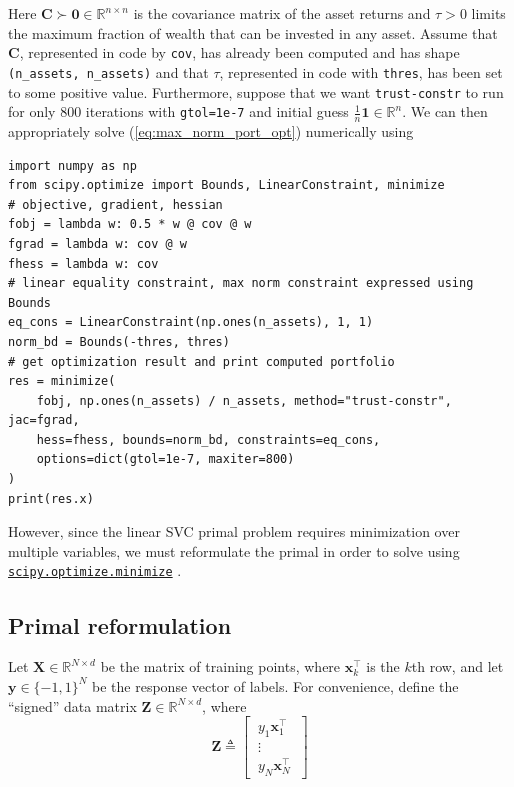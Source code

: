 \documentclass{article}
\numberwithin{equation}{section}
\newcommand{\minimize}{%
    \href{%
        https://docs.scipy.org/doc/scipy/reference/generated/%
        scipy.optimize.minimize.html%
    }{\texttt{scipy.optimize.minimize}}%
}
\begin{document}
Here $ \mathbf{C} \succ \mathbf{0} \in \mathbb{R}^{n \times n} $ is the
covariance matrix of the asset returns and $ \tau > 0 $ limits the maximum
fraction of wealth that can be invested in any asset. Assume that
$ \mathbf{C} $, represented in code by \texttt{cov}, has already been
computed and has shape \texttt{(n\_assets, n\_assets)} and that $ \tau $,
represented in code with \texttt{thres}, has been set to some positive value.
Furthermore, suppose that we want \texttt{trust-constr} to run for only 800
iterations with \texttt{gtol=1e-7} and initial guess $ \frac{1}{n}\mathbf{1}
\in \mathbb{R}^n $. We can then appropriately solve
(\ref{eq:max_norm_port_opt}) numerically using

\begin{verbatim}
import numpy as np
from scipy.optimize import Bounds, LinearConstraint, minimize
# objective, gradient, hessian
fobj = lambda w: 0.5 * w @ cov @ w
fgrad = lambda w: cov @ w
fhess = lambda w: cov
# linear equality constraint, max norm constraint expressed using Bounds
eq_cons = LinearConstraint(np.ones(n_assets), 1, 1)
norm_bd = Bounds(-thres, thres)
# get optimization result and print computed portfolio
res = minimize(
    fobj, np.ones(n_assets) / n_assets, method="trust-constr", jac=fgrad,
    hess=fhess, bounds=norm_bd, constraints=eq_cons,
    options=dict(gtol=1e-7, maxiter=800)
)
print(res.x)
\end{verbatim}

However, since the linear SVC primal problem requires minimization over
multiple variables, we must reformulate the primal in order to solve using
\minimize.

\subsection{Primal reformulation} \label{sec:primal_reform}

Let $ \mathbf{X} \in \mathbb{R}^{N \times d} $ be the matrix of training
points, where $ \mathbf{x}_k^\top $ is the $ k $th row, and let
$ \mathbf{y} \in \{-1, 1\}^N $ be the response vector of labels. For
convenience, define the ``signed'' data matrix
$ \mathbf{Z} \in \mathbb{R}^{N \times d} $, where
\begin{equation} \label{eq:signed_X}
    \mathbf{Z} \triangleq \begin{bmatrix}
        \ y_1\mathbf{x}_1^\top \ \\ \ \vdots \ \\ \ y_N\mathbf{x}_N^\top \
    \end{bmatrix}
\end{equation}
\end{document}
